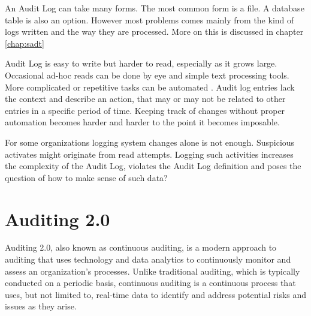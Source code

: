 

An Audit Log can take many forms. The most common form is a file. A database table is also an option. However most problems comes mainly from the kind of logs written and the way they are processed. More on this is discussed in chapter \ref{chap:sadt}

Audit Log is easy to write but harder to read, especially as it grows large. Occasional ad-hoc reads can be done by eye and simple text processing tools. More complicated or repetitive tasks can be automated \citep{AuditLog}. Audit log entries lack the context and describe an action, that may or may not be related to other entries in a specific period of time. Keeping track of changes without proper automation becomes harder and harder to the point it becomes imposable.

For some organizations logging system changes alone is not enough. Suspicious activates might originate from read attempts. Logging such activities increases the complexity of the Audit Log, violates the Audit Log definition and poses the question of how to make sense of such data?


\section{Auditing 2.0}\label{sec:adt2}

Auditing 2.0, also known as continuous auditing, is a modern approach to auditing that uses technology and data analytics to continuously monitor and assess an organization's processes. Unlike traditional auditing, which is typically conducted on a periodic basis, continuous auditing is a continuous process that uses, but not limited to, real-time data to identify and address potential risks and issues as they arise.~\citep{5427384}

